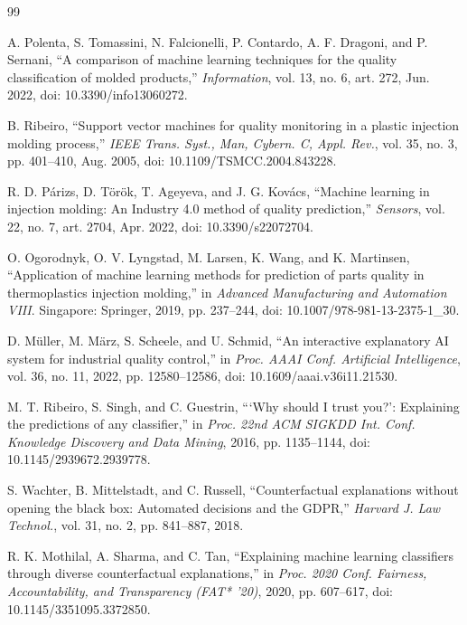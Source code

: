 \documentclass[11pt,a4paper]{article}
\begin{document}
\begin{thebibliography}{99}
\footnotesize

 A. Polenta, S. Tomassini, N. Falcionelli, P. Contardo, A. F. Dragoni, and P. Sernani, ``A comparison of machine learning techniques for the quality classification of molded products,'' \emph{Information}, vol. 13, no. 6, art. 272, Jun. 2022, doi: 10.3390/info13060272.

 B. Ribeiro, ``Support vector machines for quality monitoring in a plastic injection molding process,'' \emph{IEEE Trans. Syst., Man, Cybern. C, Appl. Rev.}, vol. 35, no. 3, pp. 401--410, Aug. 2005, doi: 10.1109/TSMCC.2004.843228.

 R. D. P\'{a}rizs, D. T\"{o}r\"{o}k, T. Ageyeva, and J. G. Kov\'{a}cs, ``Machine learning in injection molding: An Industry 4.0 method of quality prediction,'' \emph{Sensors}, vol. 22, no. 7, art. 2704, Apr. 2022, doi: 10.3390/s22072704.

 O. Ogorodnyk, O. V. Lyngstad, M. Larsen, K. Wang, and K. Martinsen, ``Application of machine learning methods for prediction of parts quality in thermoplastics injection molding,'' in \emph{Advanced Manufacturing and Automation VIII}. Singapore: Springer, 2019, pp. 237--244, doi: 10.1007/978-981-13-2375-1\_30.

 D. M\"{u}ller, M. M\"{a}rz, S. Scheele, and U. Schmid, ``An interactive explanatory AI system for industrial quality control,'' in \emph{Proc. AAAI Conf. Artificial Intelligence}, vol. 36, no. 11, 2022, pp. 12580--12586, doi: 10.1609/aaai.v36i11.21530.

 M. T. Ribeiro, S. Singh, and C. Guestrin, ```Why should I trust you?': Explaining the predictions of any classifier,'' in \emph{Proc. 22nd ACM SIGKDD Int. Conf. Knowledge Discovery and Data Mining}, 2016, pp. 1135--1144, doi: 10.1145/2939672.2939778.

 S. Wachter, B. Mittelstadt, and C. Russell, ``Counterfactual explanations without opening the black box: Automated decisions and the GDPR,'' \emph{Harvard J. Law Technol.}, vol. 31, no. 2, pp. 841--887, 2018.

 R. K. Mothilal, A. Sharma, and C. Tan, ``Explaining machine learning classifiers through diverse counterfactual explanations,'' in \emph{Proc. 2020 Conf. Fairness, Accountability, and Transparency (FAT* '20)}, 2020, pp. 607--617, doi: 10.1145/3351095.3372850.


\end{thebibliography}
\end{document}
